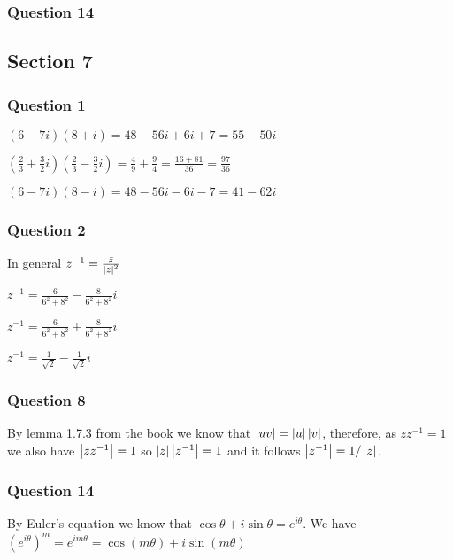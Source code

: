 \documentclass{article}
\begin{document}
\subsubsection{Question 14}


\subsection{Section 7}
\subsubsection{Question 1}

 $(6-7i)(8+i) = 48 - 56i + 6i + 7 = 55-50i$

 $(\frac 23 + \frac 32i)(\frac23 - \frac 32i) = \frac49+\frac94=\frac{16+81}{36} = \frac{97}{36}$

 $(6-7i)(8-i) = 48-56i-6i-7 = 41-62i$

\subsubsection{Question 2}

In general $z^{-1} = \frac{\bar z}{\left|{z}\right|^2}$

 $z^{-1} = \frac{6}{6^2+8^2} - \frac8{6^2+8^2}i$

 $z^{-1} = \frac{6}{6^2+8^2} + \frac8{6^2+8^2}i$

 $z^{-1} = \frac1{\sqrt2} - \frac1{\sqrt 2}i$

\subsubsection{Question 8}

By lemma 1.7.3 from the book we know that $\left|{uv}\right| = \left|{u}\right|\left|{v}\right|$, therefore, as $zz^{-1} = 1$ we also have $\left|{zz^{-1}}\right| = 1$ so $\left|{z}\right|\left|{z^{-1}}\right| = 1$ and it follows $\left|{z^{-1}}\right| = 1 / \left|{z}\right|$.

\subsubsection{Question 14}

By Euler's equation we know that $\cos\theta + i\sin\theta = e^{i\theta}$. We have ${\left(e^{i\theta}\right)}^m = e^{im\theta} = \cos (m\theta) + i\sin (m\theta)$
\end{document}
